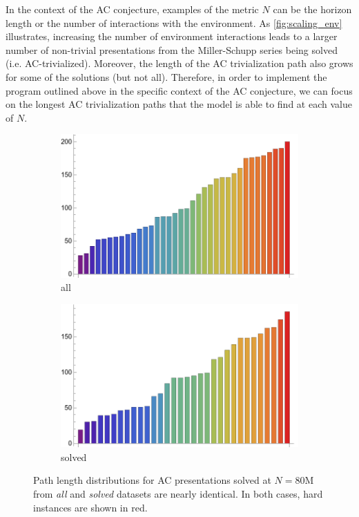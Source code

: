 In the context of the AC conjecture, examples of the metric $N$ can be the horizon length or the number of interactions with the environment. As \autoref{fig:scaling_env} illustrates, increasing the number of environment interactions leads to a larger number of non-trivial presentations from the Miller-Schupp series being solved (i.e. AC-trivialized). Moreover, the length of the AC trivialization path also grows for some of the solutions (but not all).
%
Therefore, in order to implement the program outlined above in the specific context of the AC conjecture, we can focus on the longest AC trivialization paths that the model is able to find at each value of $N$.

\begin{figure}[h]
    \centering
    \begin{subfigure}{0.45\textwidth}
        \centering
        \includegraphics[width=\textwidth]{fig/all_path_length_80M.png}
        \caption{all}
        \label{fig:all_path_length_80M}
    \end{subfigure}
    \hfill
    \begin{subfigure}{0.45\textwidth}
        \centering
        \includegraphics[width=\textwidth]{fig/solved_path_length_80M.png}
        \caption{solved}
        \label{fig:solved_path_length_80M}
    \end{subfigure}
    \caption{Path length distributions for AC presentations solved at $N=80$M from \textit{all} and \textit{solved} datasets are nearly identical. In both cases, hard instances are shown in red.}
    \label{fig:path_length_80M}
\end{figure}

